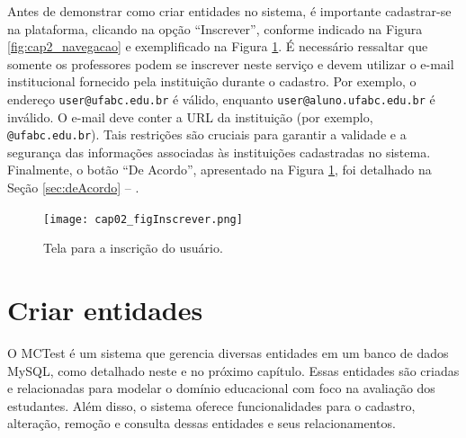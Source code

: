 Antes de demonstrar como criar entidades no sistema, é importante cadastrar-se na plataforma, clicando na opção ``Inscrever'', conforme indicado na Figura \ref{fig:cap2_navegacao} e exemplificado na Figura \ref{fig:inscrever}. É necessário ressaltar que somente os professores podem se inscrever neste serviço e devem utilizar o e-mail institucional fornecido pela instituição durante o cadastro. Por exemplo, o endereço \texttt{user@ufabc.edu.br} é válido, enquanto \texttt{user@aluno.ufabc.edu.br} é inválido. O e-mail deve conter a URL da instituição (por exemplo, \texttt{@ufabc.edu.br}). Tais restrições são cruciais para garantir a validade e a segurança das informações associadas às instituições cadastradas no sistema. Finalmente, o botão ``De Acordo'', apresentado na Figura \ref{fig:inscrever}, foi detalhado na Seção \ref{sec:deAcordo} -- .


\begin{figure}[!ht]
  \centering
  \texttt{[image: cap02\_figInscrever.png]} 
  \caption{Tela para a inscrição do usuário.}
  \label{fig:inscrever}
\end{figure}

\section{Criar entidades}

O MCTest é um sistema que gerencia diversas entidades em um banco de dados MySQL, como detalhado neste e no próximo capítulo. Essas entidades são criadas e relacionadas para modelar o domínio educacional com foco na avaliação dos estudantes. Além disso, o sistema oferece funcionalidades para o cadastro, alteração, remoção e consulta dessas entidades e seus relacionamentos.

